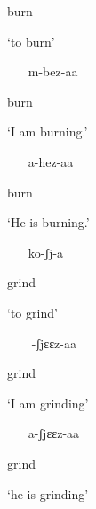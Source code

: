 burn

\textsc{‘}to burn’

\begin{itemize}
\item [m-bez-aa]

\end{itemize}

burn

\textsc{‘}I am burning.’

\begin{itemize}
\item [a-hez-aa]

\end{itemize}

burn

\textsc{‘}He is burning.’

\begin{itemize}
\item [ko-ʃj-a]

\end{itemize}

grind

\textsc{‘}to grind’

\begin{itemize}
\item [-ʃjɛɛz-aa]

\end{itemize}

grind

\textsc{‘}I am grinding’

\begin{itemize}
\item [a-ʃjɛɛz-aa]

\end{itemize}

grind

\textsc{‘}he is grinding’


